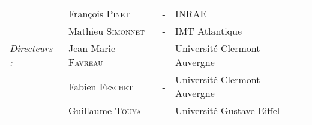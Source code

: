 \begin{titlepage}
\begin{center}
\begin{tabular}{llcl}
                              & François \textsc{Pinet}		& - & INRAE \\
                        	& Mathieu \textsc{Simonnet}		& - & IMT Atlantique \\
      \textit{Directeurs :}	& Jean-Marie \textsc{Favreau}		& - & Université Clermont Auvergne \\
                              & Fabien \textsc{Feschet}		& - & Université Clermont Auvergne\\
                              & Guillaume \textsc{Touya}		& - & Université Gustave Eiffel \\
\end{tabular}
\end{center}
\end{titlepage}

\sloppy

\titlepage

